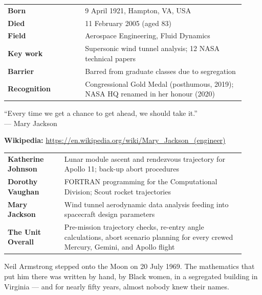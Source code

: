 \documentclass[12pt,a4paper]{article}
\makeatletter
\newcommand{\keyfacts}[1]{%
  \begin{tcolorbox}[factbox, title={Key Facts}]
  \begin{tabular}{@{}p{0.3\linewidth}p{0.62\linewidth}@{}}
  #1
  \end{tabular}
  \end{tcolorbox}
}
\newcommand{\pullquote}[2]{%
  \begin{tcolorbox}[quotebox]
  ``#1''\\[4pt]
  {\small\normalfont\color{medgray}--- #2}
  \end{tcolorbox}
}
\makeatother
\begin{document}
\keyfacts{
\textbf{Born}           & 9 April 1921, Hampton, VA, USA\\[3pt]
\textbf{Died}           & 11 February 2005 (aged 83)\\[3pt]
\textbf{Field}          & Aerospace Engineering, Fluid Dynamics\\[3pt]
\textbf{Key work}       & Supersonic wind tunnel analysis; 12 NASA technical papers\\[3pt]
\textbf{Barrier}        & Barred from graduate classes due to segregation\\[3pt]
\textbf{Recognition}    & Congressional Gold Medal (posthumous, 2019); NASA HQ renamed in her honour (2020)\\
}

\pullquote{Every time we get a chance to get ahead, we should take it.}{Mary Jackson}

\textbf{Wikipedia:} \url{https://en.wikipedia.org/wiki/Mary_Jackson_(engineer)}

\vspace{10pt}

\begin{tcolorbox}[factbox, title={The Apollo Connection: What They Actually Calculated}]
\begin{tabular}{@{}p{0.22\linewidth}p{0.70\linewidth}@{}}
\textbf{Katherine Johnson} & Lunar module ascent and rendezvous trajectory for Apollo 11; back-up abort procedures\\[5pt]
\textbf{Dorothy Vaughan}   & FORTRAN programming for the Computational Division; Scout rocket trajectories\\[5pt]
\textbf{Mary Jackson}      & Wind tunnel aerodynamic data analysis feeding into spacecraft design parameters\\[5pt]
\textbf{The Unit Overall}  & Pre-mission trajectory checks, re-entry angle calculations, abort scenario planning for every crewed Mercury, Gemini, and Apollo flight\\
\end{tabular}
\end{tcolorbox}

\vspace{8pt}

\begin{tcolorbox}[quotebox]
Neil Armstrong stepped onto the Moon on 20 July 1969. The mathematics that put him there was written by hand, by Black women, in a segregated building in Virginia --- and for nearly fifty years, almost nobody knew their names.
\end{tcolorbox}
\end{document}
